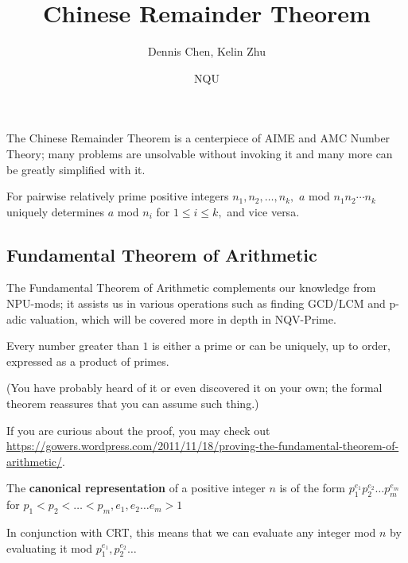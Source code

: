 \documentclass[mast]{lucky}
\title{Chinese Remainder Theorem}
\author{Dennis Chen, Kelin Zhu}
\date{NQU}
\begin{document}
\maketitle

The Chinese Remainder Theorem is a centerpiece of AIME and AMC Number Theory; many problems are unsolvable without invoking it and many more can be greatly simplified with it.

\begin{theo}
For pairwise relatively prime positive integers $n_1,n_2,\ldots,n_k,$ $a$ mod $n_1n_2\cdots n_k$ uniquely determines $a$ mod $n_i$ for $1\leq i\leq k,$ and vice versa.
\end{theo}

\subsection{Fundamental Theorem of Arithmetic}
The Fundamental Theorem of Arithmetic complements our knowledge from NPU-mods; it assists us in various operations such as finding GCD/LCM and p-adic valuation, which will be covered more in depth in NQV-Prime.
\begin{theo}
Every number greater than $1$ is either a prime or can be uniquely, up to order, expressed as a product of primes.

(You have probably heard of it or even discovered it on your own; the formal theorem reassures that you can assume such thing.)
\end{theo}

If you are curious about the proof, you may check out \url{https://gowers.wordpress.com/2011/11/18/proving-the-fundamental-theorem-of-arithmetic/}.

\begin{fact}
The \textbf{canonical representation} of a positive integer $n$ is of the form $p_1^{e_1}p_2^{e_2}\ldots p_m^{e_m}$ for $p_1<p_2<\ldots <p_m, e_1,e_2\ldots e_m>1$ 
\end{fact}

In conjunction with CRT, this means that we can evaluate any integer mod $n$ by evaluating it mod $p_1^{e_1},p_2^{e_2}\ldots$
\end{document}

